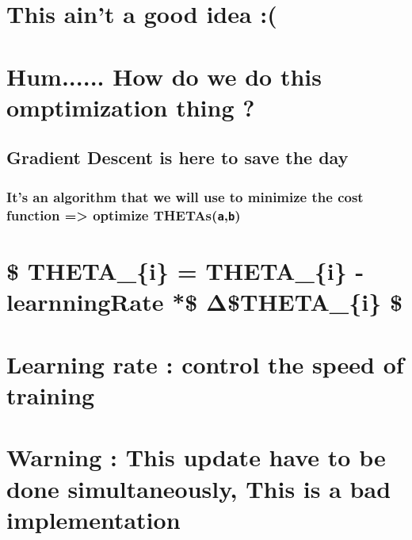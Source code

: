 \documentclass[11pt]{article}
\begin{document}
    \section{This ain't a good idea :(}\label{this-aint-a-good-idea}

    \section{Hum...... How do we do this omptimization thing
?}\label{hum......-how-do-we-do-this-omptimization-thing}

    \subsection{\texorpdfstring{\textbf{Gradient Descent} is here to save
the day
💯😊}{Gradient Descent is here to save the day 💯😊}}\label{gradient-descent-is-here-to-save-the-day}

\subsubsection{\texorpdfstring{It's an algorithm that we will use to
minimize the cost function =\textgreater{} optimize
THETAs(\texttt{a},\texttt{b})}{It's an algorithm that we will use to minimize the cost function =\textgreater{} optimize THETAs(a,b)}}\label{its-an-algorithm-that-we-will-use-to-minimize-the-cost-function-optimize-thetasab}

    \section{\$ THETA\_\{i\} = THETA\_\{i\} - learnningRate *\$
Δ\$THETA\_\{i\} \$}\label{theta_i-theta_i---learnningrate-ux3b4theta_i}

    \section{Learning rate : control the speed of
training}\label{learning-rate-control-the-speed-of-training}

    \section{\texorpdfstring{Warning : This update have to be done
\textbf{simultaneously, This is a bad
implementation}}{Warning : This update have to be done simultaneously, This is a bad implementation}}\label{warning-this-update-have-to-be-done-simultaneously-this-is-a-bad-implementation}
\end{document}
